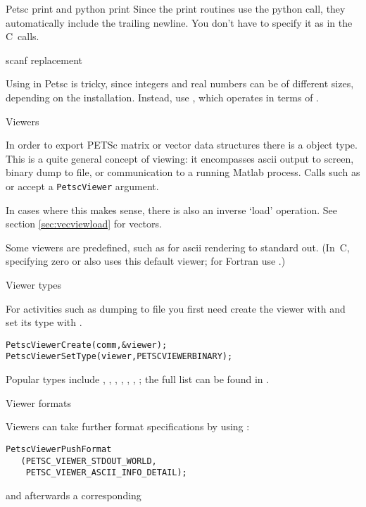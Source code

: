 \begin{pythonnote}{Petsc print and python print}
  Since the print routines use the python  call, they
  automatically include the trailing newline. You don't have to
  specify it as in the C~calls.
\end{pythonnote}

 {scanf replacement}

Using  in Petsc is tricky, since integers and real numbers can be
of different sizes, depending on the installation.
Instead, use , which operates in terms of
.

 {Viewers}
\label{sec:petsc-view}

In order to export PETSc matrix or vector data structures
there is a  object type.
This is a quite general concept of viewing: it encompasses ascii output to screen,
binary dump to file, or communication to a running Matlab process.
Calls such as   or 
accept a \lstinline{PetscViewer} argument.

In cases where this makes sense, there is also an inverse `load' operation.
See section \ref{sec:vecviewload} for vectors.

Some viewers are predefined, such as
 for ascii rendering to
standard out. (In~C, specifying zero or  also uses this
default viewer; for Fortran use .)

 {Viewer types}

For activities such as dumping to file
you first need create the viewer
with 
and set its type with .
\begin{lstlisting}
PetscViewerCreate(comm,&viewer);
PetscViewerSetType(viewer,PETSCVIEWERBINARY);  
\end{lstlisting}
Popular types include
,
,
,
,
,
,
;
the full list can be found in .

 {Viewer formats}

Viewers can take further format specifications by using
:
\begin{lstlisting}
PetscViewerPushFormat
   (PETSC_VIEWER_STDOUT_WORLD,
    PETSC_VIEWER_ASCII_INFO_DETAIL);
\end{lstlisting}
and afterwards a corresponding 


